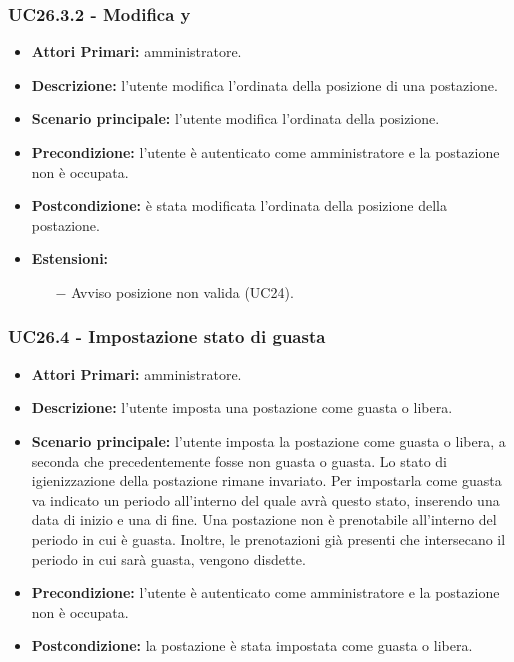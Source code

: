 \subsubsection{ UC26.3.2 - Modifica y}
\begin{itemize}
	\item\textbf{Attori Primari:}
	amministratore.
	\item\textbf{Descrizione:}
	l'utente modifica l'ordinata della posizione di una postazione.
	\item\textbf{Scenario principale:} 
	l'utente modifica l'ordinata della posizione.
	\item\textbf{Precondizione:} 
	l'utente è autenticato come amministratore e la postazione non è occupata.
	\item\textbf{Postcondizione:}
	è stata modificata l'ordinata della posizione della postazione.
	\item\textbf{Estensioni:}
	\begin{itemize}
		\item[$-$] Avviso posizione non valida (UC24).
	\end{itemize}
\end{itemize}

\subsubsection{ UC26.4 - Impostazione stato di guasta}
\begin{itemize}
	\item\textbf{Attori Primari:}
	amministratore.
	\item\textbf{Descrizione:}
	l'utente imposta una postazione come guasta o libera.
	\item\textbf{Scenario principale:} 
	l'utente imposta la postazione come guasta o libera, a seconda che precedentemente fosse non guasta o guasta. Lo stato di igienizzazione della postazione rimane invariato. Per impostarla come guasta va indicato un periodo all'interno del quale avrà questo stato, inserendo una data di inizio e una di fine. \newline
	Una postazione non è prenotabile all'interno del periodo in cui è guasta. Inoltre, le prenotazioni già presenti che intersecano il periodo in cui sarà guasta, vengono disdette.
	\item\textbf{Precondizione:} 
	l'utente è autenticato come amministratore e la postazione non è occupata.
	\item\textbf{Postcondizione:}
	la postazione è stata impostata come guasta o libera.
\end{itemize}


